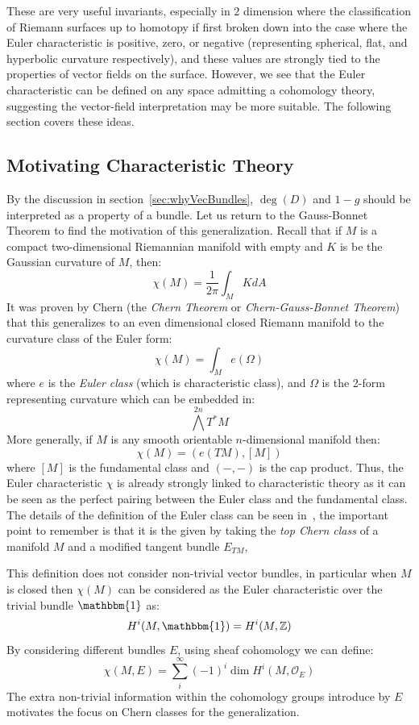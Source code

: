 \documentclass{book}
\newcommand{\Z}{{\mathbb{Z}}}
\newcommand{\CO}{{\mathcal{O}}}
\begin{document}
These are very useful invariants, especially in $2$ dimension where the classification of Riemann surfaces up
to homotopy if first broken down into the case where the Euler characteristic is positive, zero, or negative
(representing spherical, flat, and hyperbolic curvature respectively), and these values are strongly tied to
the properties of vector fields on the surface. However, we see that the Euler characteristic can be defined
on any space admitting a cohomology theory, suggesting the vector-field interpretation may be more suitable. The
following section covers these ideas.


\subsection{Motivating Characteristic Theory}\label{sec:motivatingCharTheory}

By the discussion in section~\ref{sec:whyVecBundles}, $\deg(D)$ and $1-g$ should be interpreted as a property
of a bundle. Let us return to the Gauss-Bonnet Theorem to find the motivation of this generalization. Recall
that if $M$ is a compact two-dimensional Riemannian manifold with empty and $K$ is be the Gaussian curvature
of $M$, then:
\[
  \chi(M) = \frac{1}{2\pi }\int_M K dA
\]
It was proven by Chern (the \emph{Chern Theorem} or \emph{Chern-Gauss-Bonnet Theorem}) that this generalizes
to an even dimensional closed Riemann manifold to the curvature class of the Euler form:
\[
  \chi(M) = \int_M e(\Omega)
\]
where $e$ is the \emph{Euler class} (which is characteristic class), and $\Omega$ is the 2-form representing
curvature which can be embedded in: \[
  \bigwedge^{2n} T^*M
\]
More generally, if $M$ is any smooth orientable $n$-dimensional manifold then:
\[
  \chi(M) = (e(TM), [M])
\]
where $[M]$ is the fundamental class and $(-,-)$ is the cap product. Thus, the Euler characteristic $\chi$ is
already strongly linked to characteristic theory as it can be seen as the perfect pairing between the Euler
class and the fundamental class. The details of the definition of the Euler class can be seen
in~\cite{NateKTheory}, the important point to remember is that it is the given by taking the \emph{top Chern
class} of a manifold $M$ and a modified tangent bundle $E_{TM}$,

This definition does not consider non-trivial vector bundles, in particular when $M$ is closed then $\chi(M)$
can be considered as the Euler characteristic over the trivial bundle $\mathbbm{1}$ as:
\[
  H^i(M, \mathbbm{1}) = H^i(M, \Z)
\]
By considering different bundles $E$, using sheaf cohomology we can define:
\[
  \chi(M, E) = \sum_i^\infty (-1)^i \dim H^i(M, \CO_E)
\]
The extra non-trivial information within the cohomology groups introduce by $E$ motivates the focus on Chern
classes for the generalization.
\end{document}
